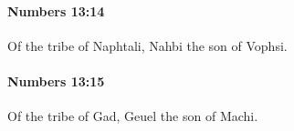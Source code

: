 		\paragraph{Numbers 13:14} %
			\label{NUMBERS-13-14}

			Of the tribe of Naphtali, Nahbi the son of Vophsi.


		\paragraph{Numbers 13:15} %
			\label{NUMBERS-13-15}

			Of the tribe of Gad, Geuel the son of Machi.


